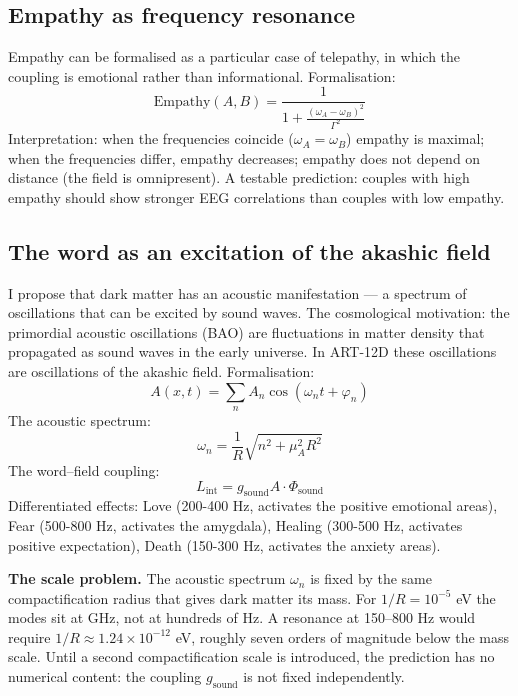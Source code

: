 \subsection{Empathy as frequency resonance}
Empathy can be formalised as a particular case of telepathy, in which the coupling is emotional rather than informational. Formalisation:
\begin{equation}
\text{Empathy}(A,B) = \frac{1}{1 + \frac{(\omega_A - \omega_B)^2}{\Gamma^2}}
\end{equation}
Interpretation: when the frequencies coincide ($\omega_A = \omega_B$) empathy is maximal; when the frequencies differ, empathy decreases; empathy does not depend on distance (the field is omnipresent). A testable prediction: couples with high empathy should show stronger EEG correlations than couples with low empathy.

\subsection{The word as an excitation of the akashic field}
I propose that dark matter has an acoustic manifestation --- a spectrum of oscillations that can be excited by sound waves. The cosmological motivation: the primordial acoustic oscillations (BAO) are fluctuations in matter density that propagated as sound waves in the early universe. In ART-12D these oscillations are oscillations of the akashic field. Formalisation:
\begin{equation}
A(x,t) = \sum_n A_n \cos(\omega_n t + \varphi_n)
\end{equation}
The acoustic spectrum:
\begin{equation}
\omega_n = \frac{1}{R} \sqrt{n^2 + \mu_A^2 R^2}
\end{equation}
The word--field coupling:
\begin{equation}
L_{\text{int}} = g_{\text{sound}} A \cdot \Phi_{\text{sound}}
\end{equation}
Differentiated effects: Love (200-400 Hz, activates the positive emotional areas), Fear (500-800 Hz, activates the amygdala), Healing (300-500 Hz, activates positive expectation), Death (150-300 Hz, activates the anxiety areas).

\textbf{The scale problem.} The acoustic spectrum $\omega_n$ is fixed by the same compactification radius that gives dark matter its mass. For $1/R = 10^{-5}$ eV the modes sit at GHz, not at hundreds of Hz. A resonance at 150--800 Hz would require $1/R \approx 1.24\times10^{-12}$ eV, roughly seven orders of magnitude below the mass scale. Until a second compactification scale is introduced, the prediction has no numerical content: the coupling $g_{\text{sound}}$ is not fixed independently.

